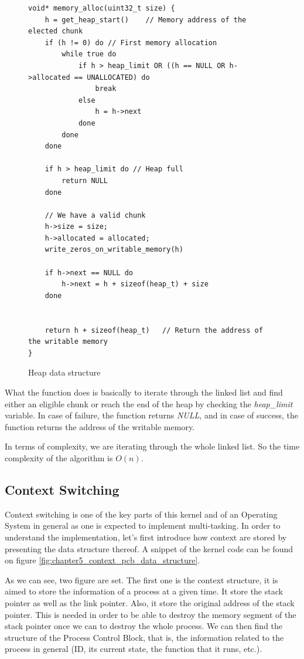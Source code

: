 \lstset{language=C}
\begin{figure}[H]
\begin{minipage}{\linewidth}
\begin{lstlisting}[frame=single]
void* memory_alloc(uint32_t size) {
    h = get_heap_start()    // Memory address of the elected chunk
    if (h != 0) do // First memory allocation
        while true do
            if h > heap_limit OR ((h == NULL OR h->allocated == UNALLOCATED) do
                break
            else
                h = h->next
            done
        done
    done
    
    if h > heap_limit do // Heap full
        return NULL 
    done
    
    // We have a valid chunk
    h->size = size;
    h->allocated = allocated;
    write_zeros_on_writable_memory(h)
    
    if h->next == NULL do
        h->next = h + sizeof(heap_t) + size
    done
    
    
    return h + sizeof(heap_t)   // Return the address of the writable memory
}
\end{lstlisting}
\end{minipage}
\caption{Heap data structure}
\end{figure}


What the function does is basically to iterate through the linked list and find either an eligible chunk or reach the end of the heap by checking the \textit{heap\_limit} variable. In case of failure, the function returns \textit{NULL}, and in case of success, the function returns the address of the writable memory.

In terms of complexity, we are iterating through the whole linked list. So the time complexity of the algorithm is $O(n)$.




\subsection{Context Switching}
Context switching is one of the key parts of this kernel and of an Operating System in general as one is expected to implement multi-tasking. In order to understand the implementation, let's first introduce how context are stored by presenting the data structure thereof. A snippet of the kernel code can be found on figure \ref{fig:chapter5_context_pcb_data_structure}.

As we can see, two figure are set. The first one is the context structure, it is aimed to store the information of a process at a given time. It store the stack pointer as well as the link pointer. Also, it store the original address of the stack pointer. This is needed in order to be able to destroy the memory segment of the stack pointer once we can to destroy the whole process. We can then find the structure of the Process Control Block, that is, the information related to the process in general (ID, its current state, the function that it runs, etc.).


